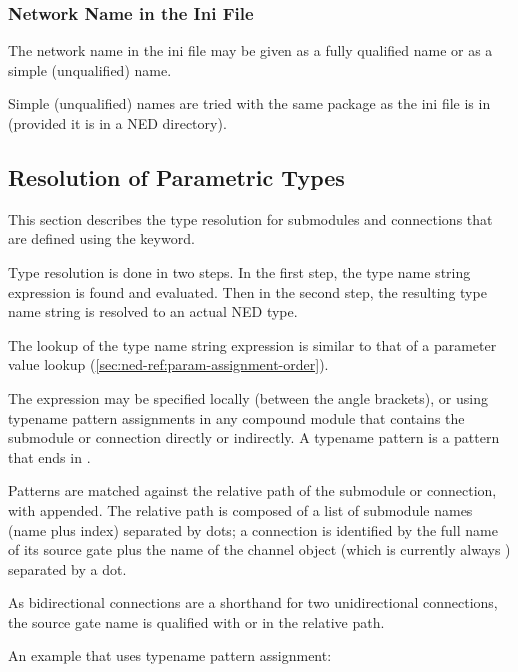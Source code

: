 {\subsubsection{Network Name in the Ini File}
\label{sec:ned-ref:network-name-in-ini-file}

The network name in the ini file may be given as a fully qualified name
or as a simple (unqualified) name.

Simple (unqualified) names are tried with the same package as the
ini file is in (provided it is in a NED directory).


\subsection{Resolution of Parametric Types}
\label{sec:ned-ref:parameteric-type-resolution}

This section describes the type resolution for submodules and connections
that are defined using the  keyword.

Type resolution is done in two steps. In the first step, the type name
string expression is found and evaluated. Then in the second step, the
resulting type name string is resolved to an actual NED type.

 The lookup of the type name string expression is similar to
that of a parameter value lookup (\ref{sec:ned-ref:param-assignment-order}).

The expression may be specified locally (between the angle brackets), or
using typename pattern assignments in any compound module that
contains the submodule or connection directly or indirectly. A
typename pattern is a pattern that ends in .

Patterns are matched against the relative path of the submodule or
connection, with  appended. The relative path is
composed of a list of submodule names (name plus index) separated
by dots; a connection is identified by the full name of its source
gate plus the name of the channel object (which is currently always
) separated by a dot.

\begin{note}
As bidirectional connections are a shorthand for two unidirectional
connections, the source gate name is qualified with  or
 in the relative path.
\end{note}

An example that uses typename pattern assignment:

}
